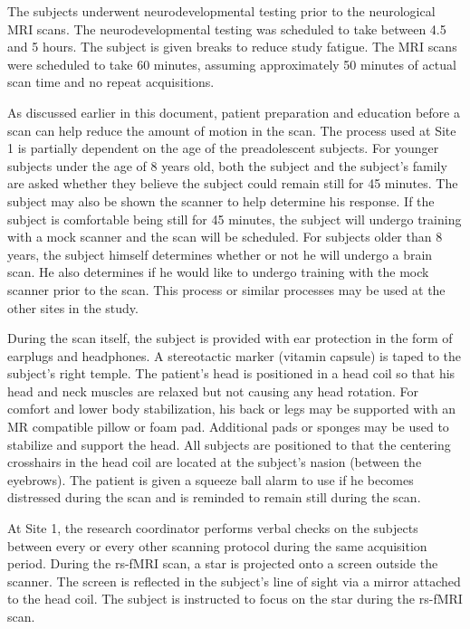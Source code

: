 The subjects underwent neurodevelopmental testing prior to the neurological MRI scans. The neurodevelopmental testing was scheduled to take between 4.5 and 5 hours. The subject is given breaks to reduce study fatigue. The MRI scans were scheduled to take 60 minutes, assuming approximately 50 minutes of actual scan time and no repeat acquisitions. 

As discussed earlier in this document, patient preparation and education before a scan can help reduce the amount of motion in the scan. The process used at Site 1 is partially dependent on the age of the preadolescent subjects. For younger subjects under the age of 8 years old, both the subject and the subject's family are asked whether they believe the subject could remain still for 45 minutes. The subject may also be shown the scanner to help determine his response. If the subject is comfortable being still for 45 minutes, the subject will undergo training with a mock scanner and the scan will be scheduled. For subjects older than 8 years, the subject himself determines whether or not he will undergo a brain scan. He also determines if he would like to undergo training with the mock scanner prior to the scan. This process or similar processes may be used at the other sites in the study.

During the scan itself, the subject is provided with ear protection in the form of earplugs and headphones. A stereotactic marker (vitamin capsule) is taped to the subject's right temple. The patient's head is positioned in a head coil so that his head and neck muscles are relaxed but not causing any head rotation. For comfort and lower body stabilization, his back or legs may be supported with an MR compatible pillow or foam pad. Additional pads or sponges may be used to stabilize and support the head. All subjects are positioned to that the centering crosshairs in the head coil are located at the subject's nasion (between the eyebrows). The patient is given a squeeze ball alarm to use if he becomes distressed during the scan and is reminded to remain still during the scan. 

At Site 1, the research coordinator performs verbal checks on the subjects between every or every other scanning protocol during the same acquisition period. During the rs-fMRI scan, a star is projected onto a screen outside the scanner. The screen is reflected in the subject's line of sight via a mirror attached to the head coil. The subject is instructed to focus on the star during the rs-fMRI scan.

